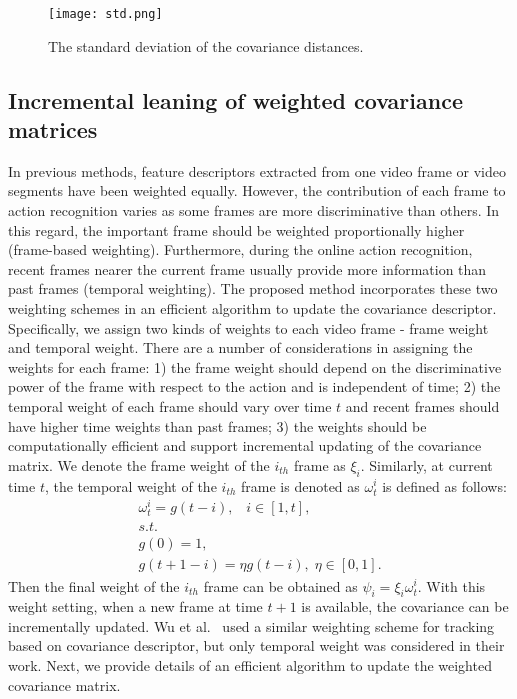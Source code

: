 \documentclass[sigconf]{acmart}
\begin{document}
\begin{figure}
  \centering
  \texttt{[image: std.png]}\\
  \caption{The standard deviation of the covariance distances.}\label{Std}
\end{figure}

\subsection{Incremental leaning of weighted covariance matrices}
\label{IncrementalCovarianceLearning}
In previous methods, feature descriptors extracted from one video frame or video segments have been weighted equally. However, the contribution of each frame to action recognition varies as some frames are more discriminative than others. In this regard, the important frame should be weighted proportionally higher (frame-based weighting). Furthermore, during the online action recognition, recent frames nearer the current frame usually provide more information than past frames (temporal weighting). The proposed method incorporates these two weighting schemes in an efficient algorithm to update the covariance descriptor. Specifically, we assign two kinds of weights to each video frame - frame weight and temporal weight. There are a number of considerations in assigning the weights for each frame: 1) the frame weight should depend on the discriminative power of the frame with respect to the action and is independent of time; 2) the temporal weight of each frame should vary over time $t$ and recent frames should have higher time weights than past frames; 3) the weights should be computationally efficient and support incremental updating of the covariance matrix. We denote the frame weight of the $i_{th}$ frame as $\xi_i$. Similarly, at current time $t$, the temporal weight of the $i_{th}$ frame is denoted as $\omega _t^i$ is defined as follows:
\begin{equation}\label{TimeW}
\begin{array}{l}
\omega _t^i = g(t - i),\;\;\;i \in [1,t],\;\;\;\\
s.t.\;\\
g(0) = 1,\\
g(t + 1 - i) = \eta g(t - i),\; \eta \in [0,1].
\end{array}
\end{equation}
Then the final weight of the $i_{th}$ frame can be obtained as ${\psi _i} = {\xi _i}\omega _t^i$. With this weight setting, when a new frame at time $t+1$ is available, the covariance can be incrementally updated. Wu et al.~\cite{wu2012real} used a similar weighting scheme for tracking based on covariance descriptor, but only temporal weight was considered in their work. Next, we provide details of an efficient algorithm to update the weighted covariance matrix.
\end{document}
